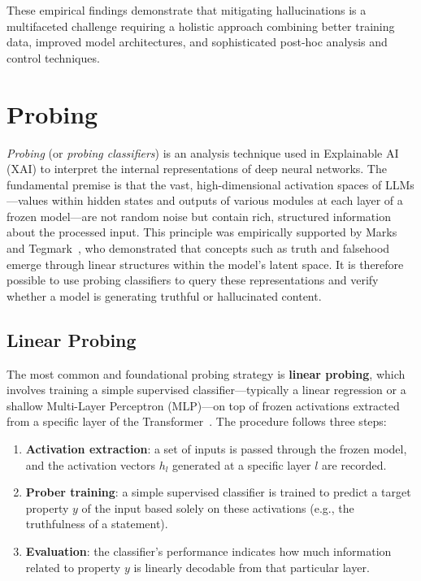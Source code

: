 These empirical findings demonstrate that mitigating hallucinations is a multifaceted challenge
requiring a holistic approach combining better training data, improved model architectures, and
sophisticated post-hoc analysis and control techniques.



\section{Probing}


\textit{Probing} (or \textit{probing classifiers}) is an analysis technique used in Explainable
AI (XAI) to interpret the internal representations of deep neural networks. The fundamental
premise is that the vast, high-dimensional activation spaces of LLMs—values within hidden states
and outputs of various modules at each layer of a frozen model—are not random noise but contain
rich, structured information about the processed input. This principle was empirically supported
by Marks and Tegmark~\cite{Geometry}, who demonstrated that concepts such as truth and falsehood
emerge through linear structures within the model's latent space. It is therefore possible to use
probing classifiers to query these representations and verify whether a model is generating
truthful or hallucinated content.


\subsection{Linear Probing}

The most common and foundational probing strategy is \textbf{linear probing}, which involves
training a simple supervised classifier—typically a linear regression or a shallow
Multi-Layer Perceptron (MLP)—on top of frozen activations extracted from a specific layer of the
Transformer~\cite{azaria2023internal}. The procedure follows three steps:
\begin{enumerate}
    \item \textbf{Activation extraction}: a set of inputs is passed through the frozen model, and
          the activation vectors \(h_l\) generated at a specific layer \(l\) are recorded.
    \item \textbf{Prober training}: a simple supervised classifier is trained to predict a target
          property \(y\) of the input based solely on these activations (e.g., the truthfulness of
          a statement).
    \item \textbf{Evaluation}: the classifier's performance indicates how much information related
          to property \(y\) is linearly decodable from that particular layer.
\end{enumerate}

